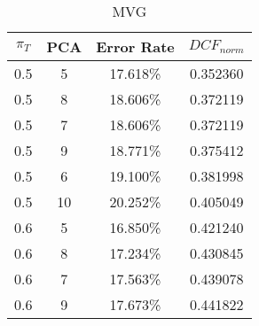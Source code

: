 \begin{center}
\begin{longtable}{|c|c|c|c|}
\caption{MVG}\label{tab:mvg_acctable}\\
\hline
$\pi_T$ & PCA & Error Rate & $DCF_{norm}$\\
\hline
0.5 & 5 & 17.618\% & 0.352360\\
\hline
0.5 & 8 & 18.606\% & 0.372119\\
\hline
0.5 & 7 & 18.606\% & 0.372119\\
\hline
0.5 & 9 & 18.771\% & 0.375412\\
\hline
0.5 & 6 & 19.100\% & 0.381998\\
\hline
0.5 & 10 & 20.252\% & 0.405049\\
\hline
0.6 & 5 & 16.850\% & 0.421240\\
\hline
0.6 & 8 & 17.234\% & 0.430845\\
\hline
0.6 & 7 & 17.563\% & 0.439078\\
\hline
0.6 & 9 & 17.673\% & 0.441822\\
\hline
\hline
\end{longtable}
\end{center}
